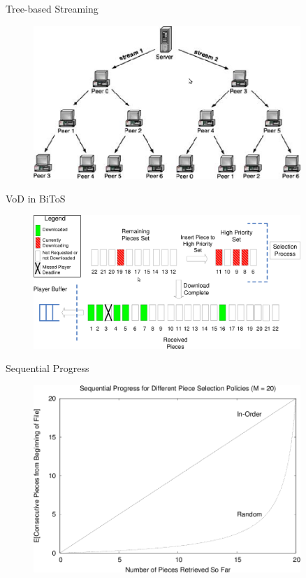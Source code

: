 \documentclass{beamer}
\begin{document}
\begin{frame}{Tree-based Streaming}
  \begin{figure}
    \includegraphics[width=0.9\textwidth]{img/multi-stream-tree}
  \end{figure}
\end{frame}

\begin{frame}{VoD in BiToS}
  \begin{figure}
    \includegraphics[width=0.9\textwidth]{img/bitos-vod}
  \end{figure}
\end{frame}

\begin{frame}{Sequential Progress}
  \begin{figure}
    \includegraphics[width=0.9\textwidth]{img/sequential-progress}
  \end{figure}
\end{frame}
\end{document}
